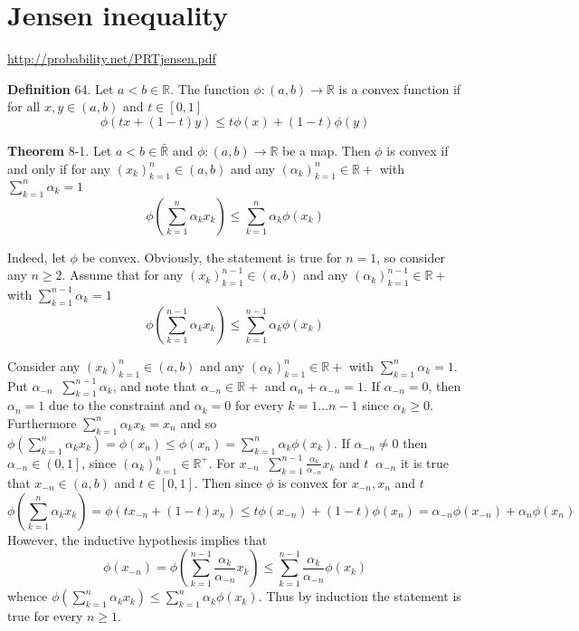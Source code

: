 \documentclass[a4paper]{article}
\newcommand{\clo}[1]{\left [ #1 \right ]}
\newcommand{\ploc}[1]{\left ( #1 \right ]}
\newcommand{\brac}[1]{\left ( #1 \right )}
\newcommand{\Rbar}{{\bar{\mathbb{R}}}}
\newcommand{\Real}{\mathbb{R}}
\newcommand{\defn}{\mathop{\overset{\Delta}{=}}\nolimits}
\begin{document}

\section{Jensen inequality} %
\label{sec:tut_8}
\url{http://probability.net/PRTjensen.pdf}

\noindent \textbf{Definition} 64.
Let $a < b\in \Real$. The function $\phi:\brac{a, b}\to \Real$ is a convex function if for all $x, y\in \brac{a,b}$ and $t\in \clo{0,1}$ \[\phi\brac{tx+\brac{1-t}y} \leq t\phi\brac{x}+\brac{1-t}\phi\brac{y} \]

\label{thm:convex_func1} \noindent \textbf{Theorem} 8-1.
Let $a<b\in \Rbar$ and $\phi:\brac{a, b}\to \Real$ be a map. Then $\phi$ is convex if and only if for any $\brac{x_k}_{k=1}^n\in \brac{a,b}$ and any $\brac{\alpha_k}_{k=1}^n\in \Real+$ with $\sum_{k=1}^n \alpha_k = 1$ \[\phi\brac{\sum_{k=1}^n \alpha_k x_k}\leq \sum_{k=1}^n \alpha_k \phi\brac{x_k}\]

Indeed, let $\phi$ be convex. Obviously, the statement is true for $n=1$, so consider any $n\geq 2$. Assume that for any $\brac{x_k}_{k=1}^{n-1}\in \brac{a,b}$ and any $\brac{\alpha_k}_{k=1}^{n-1}\in \Real+$ with $\sum_{k=1}^{n-1} \alpha_k = 1$ \[\phi\brac{\sum_{k=1}^{n-1} \alpha_k x_k}\leq \sum_{k=1}^{n-1} \alpha_k \phi\brac{x_k}\]

Consider any $\brac{x_k}_{k=1}^n\in \brac{a,b}$ and any $\brac{\alpha_k}_{k=1}^n\in \Real+$ with $\sum_{k=1}^n \alpha_k = 1$. Put $\alpha_{-n} \defn \sum_{k=1}^{n-1} \alpha_k$, and note that $\alpha_{-n}\in \Real+$ and $\alpha_n + \alpha_{-n} = 1$. If $\alpha_{-n} = 0$, then $\alpha_n = 1$ due to the constraint and $\alpha_k = 0$ for every $k=1\ldots n-1$ since $\alpha_k\geq 0$. Furthermore $\sum_{k=1}^n \alpha_k x_k = x_n$ and so $ \phi\brac{\sum_{k=1}^n \alpha_k x_k} = \phi\brac{x_n} \leq \phi\brac{x_n} = \sum_{k=1}^n \alpha_k \phi\brac{x_k}$. If $\alpha_{-n} \neq 0$ then $\alpha_{-n} \in \ploc{0, 1}$, since $\brac{\alpha_k}_{k=1}^n\in \Real^+$. For $x_{-n}\defn \sum_{k=1}^{n-1} \frac{\alpha_k}{\alpha_{-n}} x_k$ and $t\defn \alpha_{-n}$ it is true that $x_{-n}\in \brac{a, b}$ and $t \in \clo{0,1}$. Then since $\phi$ is convex for $x_{-n}, x_n$ and $t$ \[ \phi\brac{\sum_{k=1}^n \alpha_k x_k} = \phi\brac{t x_{-n} + \brac{1-t} x_n } \leq t \phi\brac{ x_{-n} } + \brac{1-t} \phi\brac{x_n} = \alpha_{-n} \phi\brac{ x_{-n} } + \alpha_n \phi\brac{x_n}\] However, the inductive hypothesis implies that \[\phi\brac{ x_{-n} } = \phi\brac{ \sum_{k=1}^{n-1} \frac{\alpha_k}{\alpha_{-n}} x_k } \leq \sum_{k=1}^{n-1} \frac{\alpha_k}{\alpha_{-n}} \phi\brac{ x_k }\] whence $\phi\brac{\sum_{k=1}^n \alpha_k x_k} \leq \sum_{k=1}^n \alpha_k \phi\brac{x_k}$. Thus by induction the statement is true for every $n\geq 1$.
\end{document}
